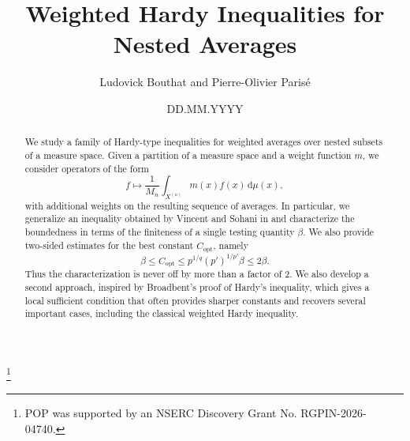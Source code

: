 \documentclass[oneside,10pt]{article}          %
\numberwithin{equation}{section}
\begin{document}
\title{Weighted Hardy Inequalities for Nested Averages}

\author{Ludovick Bouthat and Pierre-Olivier Parisé}

\address{Ludovick Bouthat, 2325 Rue de l'Université, Québec, QC G1V 0A6\\
}

\address{Pierre-Olivier Parisé, 3351 Bd des Forges, Trois-Rivières, QC G8Z 4M3,\\
}


\thanks{POP was supported by an NSERC Discovery Grant No. RGPIN-2026-04740.}

\date{DD.MM.YYYY}                               %





\begin{abstract}
We study a family of Hardy-type inequalities for weighted averages over nested subsets of a measure space. Given a partition of a measure space and a weight function $m$, we consider operators of the form
\[
f \mapsto \frac{1}{M_n}\int_{X^{(n)}} m(x)f(x)\,\mathrm{d}\mu(x),
\]
with additional weights on the resulting sequence of averages. In particular, we generalize an inequality obtained by Vincent and Sohani in \cite{VincentSohani2025} and characterize the boundedness in terms of the finiteness of a single testing quantity $\beta$. We also provide two-sided estimates for the best constant $C_{\mathrm{opt}}$, namely
\[
\beta \leq C_{\mathrm{opt}} \leq p^{1/q} (p')^{1/p'}\beta \leq 2\beta.
\]
Thus the characterization is never off by more than a factor of 2. We also develop a second approach, inspired by Broadbent's proof of Hardy's inequality, which gives a local sufficient condition that often provides sharper constants and recovers several important cases, including the classical weighted Hardy inequality.
\end{abstract}

\maketitle
\end{document}
